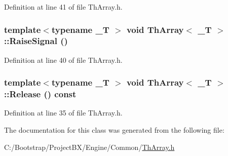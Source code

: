 Definition at line 41 of file ThArray.h.\hypertarget{class_th_array_3168354fa6c74e1cbfbe309c49876f92}{
\subsubsection[{RaiseSignal}]{\setlength{\rightskip}{0pt plus 5cm}template$<$typename \_\-T $>$ void {\bf ThArray}$<$ \_\-T $>$::RaiseSignal ()}}
\label{class_th_array_3168354fa6c74e1cbfbe309c49876f92}




Definition at line 40 of file ThArray.h.\hypertarget{class_th_array_9daa6e66a5ef48fcf563fd72145416e8}{
\subsubsection[{Release}]{\setlength{\rightskip}{0pt plus 5cm}template$<$typename \_\-T $>$ void {\bf ThArray}$<$ \_\-T $>$::Release () const}}
\label{class_th_array_9daa6e66a5ef48fcf563fd72145416e8}




Definition at line 35 of file ThArray.h.

The documentation for this class was generated from the following file:\begin{CompactItemize}
\item 
C:/Bootstrap/ProjectBX/Engine/Common/\hyperlink{_th_array_8h}{ThArray.h}\end{CompactItemize}

